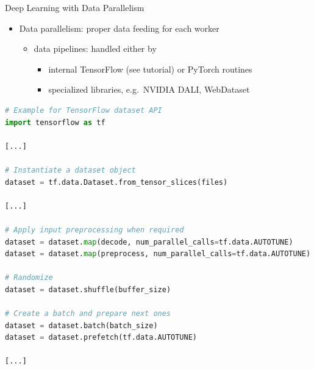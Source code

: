 \begin{frame}[fragile]{Deep Learning with Data Parallelism}
\protect\hypertarget{deep-learning-with-data-parallelism-10}{}

\begin{itemize}
\tightlist
\item
  Data parallelism: proper data feeding for each worker

  \begin{itemize}
  \tightlist
  \item
    data pipelines: handled either by

    \begin{itemize}
    \tightlist
    \item
      internal TensorFlow (see tutorial) or PyTorch routines
    \item
      specialized libraries, e.g.~NVIDIA DALI, WebDataset
    \end{itemize}
  \end{itemize}
\end{itemize}

\begin{lstlisting}[language=Python]
# Example for TensorFlow dataset API
import tensorflow as tf

[...]

# Instantiate a dataset object
dataset = tf.data.Dataset.from_tensor_slices(files)

[...]

# Apply input preprocessing when required
dataset = dataset.map(decode, num_parallel_calls=tf.data.AUTOTUNE)
dataset = dataset.map(preprocess, num_parallel_calls=tf.data.AUTOTUNE)

# Randomize
dataset = dataset.shuffle(buffer_size)

# Create a batch and prepare next ones
dataset = dataset.batch(batch_size)
dataset = dataset.prefetch(tf.data.AUTOTUNE)

[...]
\end{lstlisting}

\end{frame}

